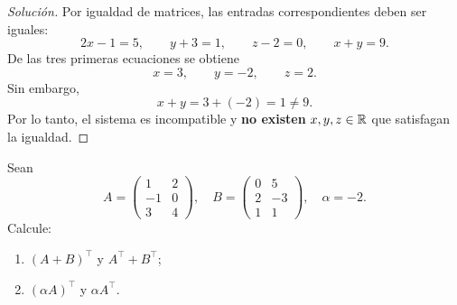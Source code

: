 \documentclass[a4,11pt]{aleph-notas}
\begin{document}
\begin{proof}[Soluci\'on]\hspace{0pt}
Por igualdad de matrices, las entradas correspondientes deben ser iguales:
\[
2x-1=5,\qquad y+3=1,\qquad z-2=0,\qquad x+y=9.
\]
De las tres primeras ecuaciones se obtiene
\[
x=3,\qquad y=-2,\qquad z=2.
\]
Sin embargo,
\[
x+y=3+(-2)=1\neq 9.
\]
Por lo tanto, el sistema es incompatible y \textbf{no existen} $x,y,z\in\mathbb{R}$ que satisfagan la igualdad.
\end{proof}

\begin{ejer}
    Sean
    \[
        A=\begin{pmatrix}1&2\\-1&0\\3&4\end{pmatrix},\quad
        B=\begin{pmatrix}0&5\\2&-3\\1&1\end{pmatrix},\quad
        \alpha=-2.
    \]
    Calcule:
    \begin{enumerate}
        \item $(A+B)^\intercal$ y $A^\intercal + B^\intercal$;
        \item $(\alpha A)^\intercal$ y $\alpha A^\intercal$.
    \end{enumerate}
\end{ejer}
\end{document}

